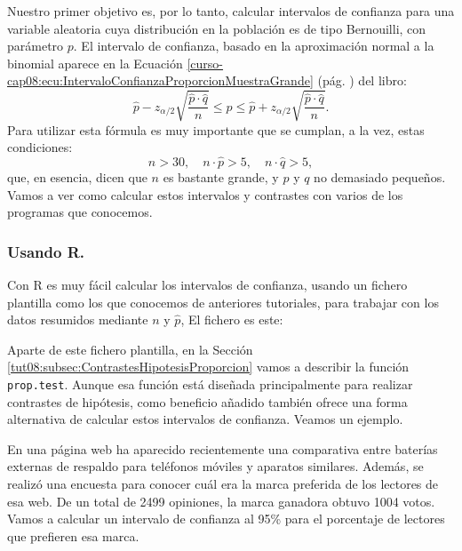 \documentclass[10pt,a4paper]{article}\usepackage[]{graphicx}\usepackage[]{color}
\newcounter {cont01}
\begin{document}
Nuestro primer objetivo es, por lo tanto, calcular intervalos de confianza para una variable aleatoria cuya distribución en la población es de tipo Bernouilli, con parámetro $p$.  El intervalo de confianza, basado en la aproximación normal a la binomial aparece en la Ecuación \ref{curso-cap08:ecu:IntervaloConfianzaProporcionMuestraGrande} (pág. \pageref{curso-cap08:ecu:IntervaloConfianzaProporcionMuestraGrande}) del libro:
    \[
        \hat p-z_{\alpha/2}\sqrt{\dfrac{\hat p\cdot \hat q}{n}}\leq p \leq \hat p
        +z_{\alpha/2}\sqrt{\dfrac{\hat p\cdot \hat q}{n}}.
    \]
Para utilizar esta fórmula es muy importante que se cumplan, a la vez, estas condiciones:
    \[n>30,\quad n\cdot\hat p>5,\quad n\cdot\hat q>5,\]
que, en esencia, dicen que $n$ es bastante grande, y $p$ y $q$ no demasiado pequeños. Vamos a ver como calcular estos intervalos y contrastes con varios de los programas que conocemos.

\subsubsection*{Usando R.}

Con R es muy fácil  calcular los intervalos de confianza, usando un fichero plantilla como los que conocemos de anteriores tutoriales, para trabajar con los datos resumidos mediante $n$ y $\hat p$,
El fichero es este:
    \begin{center}
    \end{center}
Aparte de este fichero plantilla, en la Sección \ref{tut08:subsec:ContrastesHipotesisProporcion} vamos a describir la función {\tt prop.test}. Aunque esa función está diseñada principalmente para realizar contrastes de hipótesis,  como beneficio añadido también ofrece una forma alternativa de calcular estos intervalos de confianza. Veamos un ejemplo.

En una página  web ha aparecido recientemente una comparativa entre baterías externas de respaldo para teléfonos móviles y aparatos similares. Además,
se realizó una encuesta para conocer cuál era la marca preferida de los lectores de esa web. De un total de 2499 opiniones, la marca ganadora obtuvo 1004 votos. Vamos a calcular un intervalo de confianza al 95\% para el porcentaje de lectores que prefieren esa marca.
\end{document}
